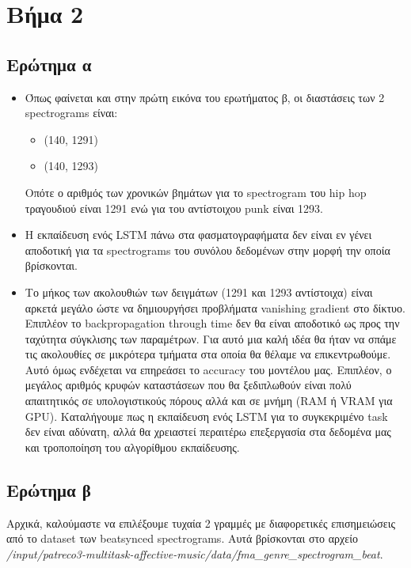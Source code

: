 \section*{Βήμα 2}
\subsection*{Ερώτημα α}

\begin{itemize}
	\item Όπως φαίνεται και στην πρώτη εικόνα του ερωτήματος β, οι διαστάσεις των 2 spectrograms είναι:
	
	\begin{itemize}
		\item (140, 1291)
		\item (140, 1293)
	\end{itemize}
	
	Οπότε ο αριθμός των χρονικών βημάτων για το spectrogram του hip hop τραγουδιού είναι 1291 ενώ για του αντίστοιχου punk είναι 1293.
	
	\item Η εκπαίδευση ενός LSTM πάνω στα φασματογραφήματα δεν είναι εν γένει αποδοτική για τα spectrograms του συνόλου δεδομένων στην μορφή την οποία βρίσκονται.
	
	\item Το μήκος των ακολουθιών των δειγμάτων (1291 και 1293 αντίστοιχα) είναι αρκετά μεγάλο ώστε να δημιουργήσει προβλήματα vanishing gradient στο δίκτυο. Επιπλέον το backpropagation through time δεν θα είναι αποδοτικό ως προς την ταχύτητα σύγκλισης των παραμέτρων. Για αυτό μια καλή ιδέα θα ήταν να σπάμε τις ακολουθίες σε μικρότερα τμήματα στα οποία θα θέλαμε να επικεντρωθούμε. Αυτό όμως ενδέχεται να επηρεάσει το accuracy του μοντέλου μας. Επιπλέον, ο μεγάλος αριθμός κρυφών καταστάσεων που θα ξεδιπλωθούν είναι πολύ απαιτητικός σε υπολογιστικούς πόρους αλλά και σε μνήμη (RAM ή VRAM για GPU). Καταλήγουμε πως η εκπαίδευση ενός LSTM για το συγκεκριμένο task δεν είναι αδύνατη, αλλά θα χρειαστεί περαιτέρω επεξεργασία στα δεδομένα μας και τροποποίηση του αλγορίθμου εκπαίδευσης.
	
\end{itemize}

\subsection*{Ερώτημα β}

Αρχικά, καλούμαστε να επιλέξουμε τυχαία 2 γραμμές με διαφορετικές επισημειώσεις από το dataset των beatsynced spectrograms. Αυτά βρίσκονται στο αρχείο \textit{/input/patreco3-multitask-affective-music/data/fma\_genre\_spectrogram\_beat}.

